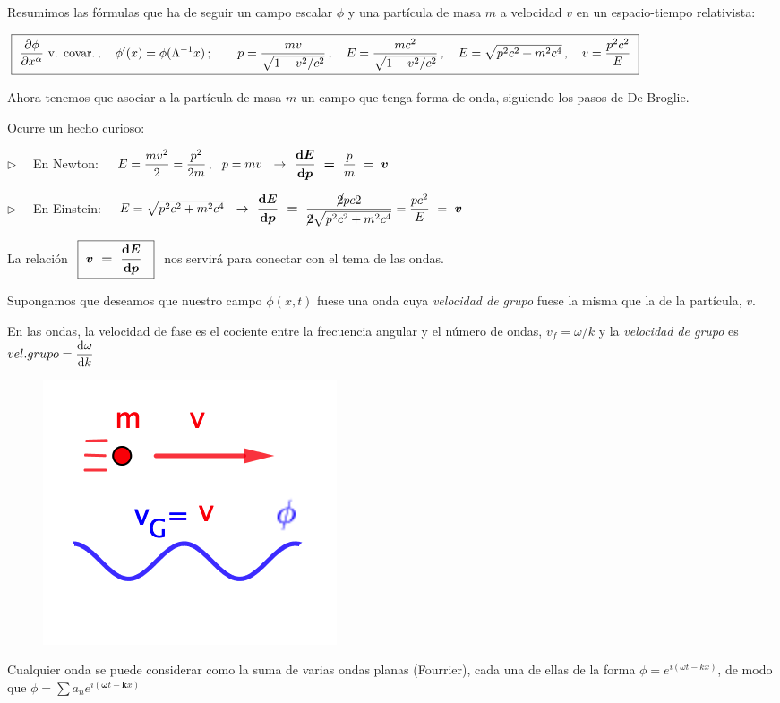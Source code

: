 Resumimos las fórmulas que ha de seguir un campo escalar $\phi$ y una partícula de masa $m$ a velocidad $v$ en un espacio-tiempo relativista:

\begin{footnotesize} $\displaystyle \boxed{ \ \pdv{\phi}{x^\alpha}\ \text{v. covar.}\, ,  \quad \phi'(x)=\phi(\Lambda^{-1}x)\, ;  \qquad 
p=\dfrac{mv}{\sqrt{1-v^2/c^2}}\, , \quad E=\dfrac{mc^2}{\sqrt{1-v^2/c^2}}\, , \quad E=\sqrt{p^2c^2+m^2c^4}\, , \quad v=\dfrac{p^2c^2}{E} \ }$ \end{footnotesize}

Ahora tenemos que asociar a la partícula de masa $m$ un campo que tenga forma de onda, siguiendo los pasos de De Broglie.

Ocurre un hecho curioso:

$\triangleright \quad$ En Newton: $\quad E=\dfrac{mv^2}{2}=\dfrac{p^2}{2m}\, , \ \ p=mv \ \ \to \ \ \displaystyle \boldsymbol{ \dv{E}{p} \ = }\ \dfrac p m \ = \ \boldsymbol v$

$\triangleright \quad$ En Einstein: $\quad E=\sqrt{p^2c^2+m^2c^4} \ \ \to \ \ \displaystyle \boldsymbol{\dv{E}{p} \ = } \ \dfrac{\cancel{2}pc2}{\cancel{2}\sqrt{p^2c^2+m^2c^4}}=\dfrac{pc^2}{E} \ = \ \boldsymbol v$

La relación $\ \boxed{ \ \boldsymbol{ v \ = \ \displaystyle \dv{E}{p} \ } \ }\ $ nos servirá para conectar con el tema de las ondas.

Supongamos que deseamos que nuestro campo $\phi(x,t)$ fuese una onda cuya \emph{velocidad de grupo} fuese la misma que la de la partícula, $v$.

\begin{multicols}{2}
\textcolor{gris}{En las ondas, la velocidad de fase es el cociente entre la frecuencia angular y el número de ondas, $v_f=\omega/k$ y la \emph{velocidad de grupo} es $vel.grupo=\displaystyle \dv{\omega}{k}$}
\begin{figure}[H]
	\centering
	\includegraphics[width=.20\textwidth]{imagenes/img33-04.png}
\end{figure}	
\end{multicols}

Cualquier onda se puede considerar como la suma de varias ondas planas (Fourrier), cada una de ellas de la forma $\phi=e^{i(\omega t-kx)}$, de modo que $\phi=\displaystyle \sum a_n e^{i(\boldsymbol \omega t- \boldsymbol kx)}$

